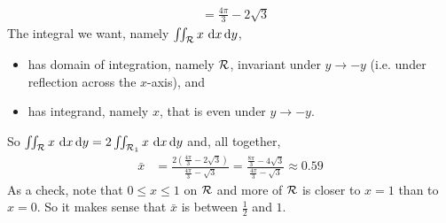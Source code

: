 \begin{eg}
\begin{align*}
&=\frac{4\pi}{3}-2\sqrt{3}
\end{align*}
The integral we want, namely $\iint_{\mathcal{R}} x\  \mathrm{d}x\,\mathrm{d}y$,
\begin{itemize}\itemsep1pt \parskip0pt 
\item 
has domain of integration, namely $\mathcal{R}$,  invariant 
under $y\rightarrow -y$ (i.e. under reflection across the $x$-axis), and
\item 
has integrand, namely $x$, that is even under $y\rightarrow -y$.
\end{itemize}
So $\iint_{\mathcal{R}} x\  \mathrm{d}x\,\mathrm{d}y
  =2\iint_{\mathcal{R}_1} x\  \mathrm{d}x\,\mathrm{d}y$ 
and, all together,
\begin{align*}
\bar x 
  &= \frac{2\left(\frac{4\pi}{3}-2\sqrt{3}\right)}{\frac{4\pi}{3}-\sqrt{3}}
  = \frac{\frac{8\pi}{3}-4\sqrt{3}}{\frac{4\pi}{3}-\sqrt{3}}
  \approx 0.59
\end{align*}
As a check, note that $0\le x\le 1$ on $\mathcal{R}$ and more of $\mathcal{R}$ is closer 
to $x=1$ than to $x=0$. So it makes sense that $\bar x$ is between
$\frac{1}{2}$ and $1$.
\end{eg}


